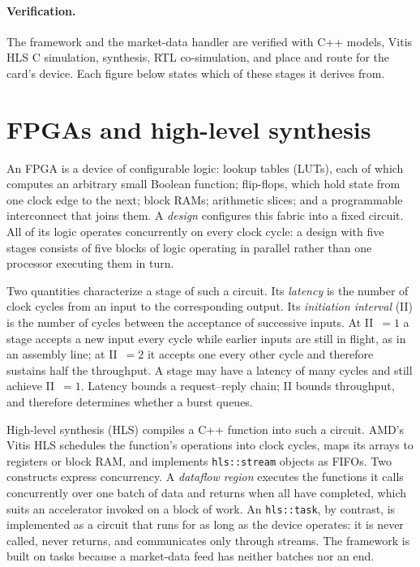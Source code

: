 \documentclass[11pt]{article}
\begin{document}
\paragraph{Verification.} The framework and the market-data handler are verified
with C++ models, Vitis HLS C simulation, synthesis, RTL co-simulation, and place
and route for the card's device. Each figure below states which of these stages
it derives from.

\section{FPGAs and high-level synthesis}
\label{sec:hls}
\label{sec:background}

An FPGA is a device of configurable logic: lookup tables (LUTs), each of which
computes an arbitrary small Boolean function; flip-flops, which hold state from
one clock edge to the next; block RAMs; arithmetic slices; and a programmable
interconnect that joins them. A \emph{design} configures this fabric into a
fixed circuit. All of its logic operates concurrently on every clock cycle: a
design with five stages consists of five blocks of logic operating in parallel
rather than one processor executing them in turn.

Two quantities characterize a stage of such a circuit. Its \emph{latency} is
the number of clock cycles from an input to the corresponding output. Its
\emph{initiation interval} (II) is the number of cycles between the acceptance
of successive inputs. At II~$=1$ a stage accepts a new input every cycle while
earlier inputs are still in flight, as in an assembly line; at II~$=2$ it
accepts one every other cycle and therefore sustains half the throughput. A
stage may have a latency of many cycles and still achieve II~$=1$. Latency
bounds a request--reply chain; II bounds throughput, and therefore determines
whether a burst queues.

High-level synthesis (HLS) compiles a C++ function into such a circuit. AMD's
Vitis HLS \cite{ug1399} schedules the function's operations into clock cycles,
maps its arrays to registers or block RAM, and implements \texttt{hls::stream}
objects as FIFOs. Two constructs express concurrency. A \emph{dataflow region}
executes the functions it calls concurrently over one batch of data and returns
when all have completed, which suits an accelerator invoked on a block of work.
An \texttt{hls::task}, by contrast, is implemented as a circuit that runs for
as long as the device operates: it is never called, never returns, and
communicates only through streams. The framework is built on tasks because a
market-data feed has neither batches nor an end.
\end{document}

